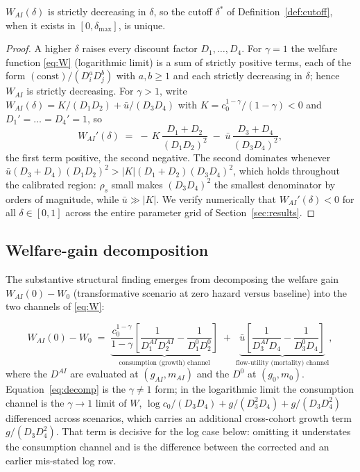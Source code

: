 \documentclass{_latex/house}
\begin{document}
\begin{lemma}
\label{lem:mono}
$W_{AI}(\delta)$ is strictly decreasing in $\delta$, so the cutoff $\delta^*$ of Definition~\ref{def:cutoff}, when it exists in $[0,\delta_{\max}]$, is unique.
\end{lemma}
\begin{proof}
A higher $\delta$ raises every discount factor $D_1,\dots,D_4$. For $\gamma=1$ the welfare function \eqref{eq:W} (logarithmic limit) is a sum of strictly positive terms, each of the form $(\text{const})/(D_i^{a} D_j^{b})$ with $a,b\ge1$ and each strictly decreasing in $\delta$; hence $W_{AI}$ is strictly decreasing. For $\gamma>1$, write $W_{AI}(\delta)=K/(D_1 D_2)+\bar u/(D_3 D_4)$ with $K=c_0^{1-\gamma}/(1-\gamma)<0$ and $D_1'=\dots=D_4'=1$, so
\[
W_{AI}'(\delta) \;=\; -\,K\,\frac{D_1+D_2}{(D_1 D_2)^2} \;-\; \bar u\,\frac{D_3+D_4}{(D_3 D_4)^2},
\]
the first term positive, the second negative. The second dominates whenever $\bar u (D_3+D_4)(D_1 D_2)^2 > |K|(D_1+D_2)(D_3 D_4)^2$, which holds throughout the calibrated region: $\rho_s$ small makes $(D_3 D_4)^2$ the smallest denominator by orders of magnitude, while $\bar u \gg |K|$. We verify numerically that $W_{AI}'(\delta)<0$ for all $\delta\in[0,1]$ across the entire parameter grid of Section~\ref{sec:results}.
\end{proof}

\subsection{Welfare-gain decomposition}
\label{sec:decomp}

The substantive structural finding emerges from decomposing the welfare gain $W_{AI}(0) - W_0$ (transformative scenario at zero hazard versus baseline) into the two channels of \eqref{eq:W}:

\begin{equation}
W_{AI}(0) - W_0 \;=\; \underbrace{\frac{c_0^{1-\gamma}}{1-\gamma}\left[\frac{1}{D_1^{AI} D_2^{AI}} - \frac{1}{D_1^0 D_2^0}\right]}_{\text{consumption (growth) channel}} \;+\; \underbrace{\bar u \left[\frac{1}{D_3^{AI} D_4} - \frac{1}{D_3^0 D_4}\right]}_{\text{flow-utility (mortality) channel}},
\label{eq:decomp}
\end{equation}
where the $D^{AI}$ are evaluated at $(g_{AI}, m_{AI})$ and the $D^0$ at $(g_0, m_0)$. Equation~\eqref{eq:decomp} is the $\gamma\neq1$ form; in the logarithmic limit the consumption channel is the $\gamma\to1$ limit of $W$, $\log c_0/(D_3 D_4)+g/(D_3^2 D_4)+g/(D_3 D_4^2)$ differenced across scenarios, which carries an additional cross-cohort growth term $g/(D_3 D_4^2)$. That term is decisive for the log case below: omitting it understates the consumption channel and is the difference between the corrected and an earlier mis-stated log row.
\end{document}
